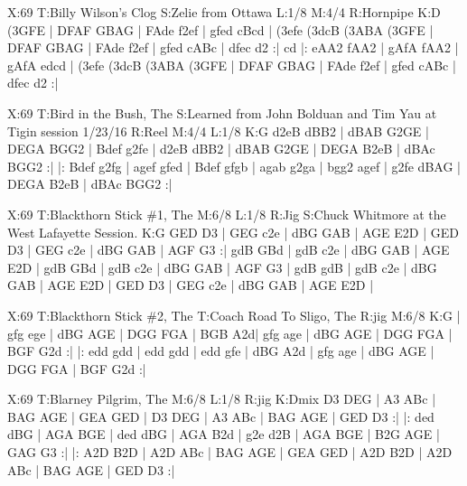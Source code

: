 \documentclass{article}
\begin{document}
\begin{abc}[name]
X:69
T:Billy Wilson's Clog
S:Zelie from Ottawa
L:1/8
M:4/4
R:Hornpipe
K:D
(3GFE | DFAF GBAG | FAde f2ef | gfed cBcd | (3efe (3dcB (3ABA (3GFE |
DFAF GBAG | FAde f2ef | gfed cABc | dfec d2 :|
cd |: eAA2 fAA2 | gAfA fAA2 | gAfA edcd | (3efe (3dcB (3ABA (3GFE |
DFAF GBAG | FAde f2ef | gfed cABc | dfec d2 :|
\end{abc}

\begin{abc}[name]
X:69
T:Bird in the Bush, The
S:Learned from John Bolduan and Tim Yau at Tigin session 1/23/16
R:Reel
M:4/4
L:1/8
K:G
d2eB dBB2 | dBAB G2GE | DEGA BGG2 | Bdef g2fe |
d2eB dBB2 | dBAB G2GE | DEGA B2eB | dBAc BGG2 :|
|: Bdef g2fg | agef gfed | Bdef gfgb | agab g2ga |
bgg2 agef | g2fe dBAG | DEGA B2eB | dBAc BGG2 :|
\end{abc}

\begin{abc}[name]
X:69
T:Blackthorn Stick \#1, The
M:6/8
L:1/8
R:Jig
S:Chuck Whitmore at the West Lafayette Session.
K:G
GED D3 | GEG c2e | dBG GAB | AGE E2D |
GED D3 | GEG c2e | dBG GAB | AGF G3 :|
gdB GBd | gdB c2e | dBG GAB | AGE E2D |
gdB GBd | gdB c2e | dBG GAB | AGF G3 |
gdB gdB | gdB c2e | dBG GAB | AGE E2D |
GED D3 | GEG c2e | dBG GAB | AGE E2D |
\end{abc}

\begin{abc}[name]
X:69
T:Blackthorn Stick \#2, The
T:Coach Road To Sligo, The
R:jig
M:6/8
K:G
| gfg ege | dBG AGE | DGG FGA | BGB A2d|
gfg age | dBG AGE | DGG FGA | BGF G2d :|
|: edd gdd | edd gdd | edd gfe | dBG A2d |
gfg age | dBG AGE | DGG FGA | BGF G2d :|
\end{abc}

\begin{abc}[name]
X:69
T:Blarney Pilgrim, The
M:6/8
L:1/8
R:jig
K:Dmix
D3 DEG | A3 ABc | BAG AGE | GEA GED |
D3 DEG | A3 ABc | BAG AGE | GED D3 :|
|: ded dBG | AGA BGE | ded dBG | AGA B2d |
g2e d2B | AGA BGE | B2G AGE | GAG G3 :|
|: A2D B2D | A2D ABc | BAG AGE | GEA GED |
A2D B2D | A2D ABc | BAG AGE | GED D3 :|
\end{abc}
\end{document}
